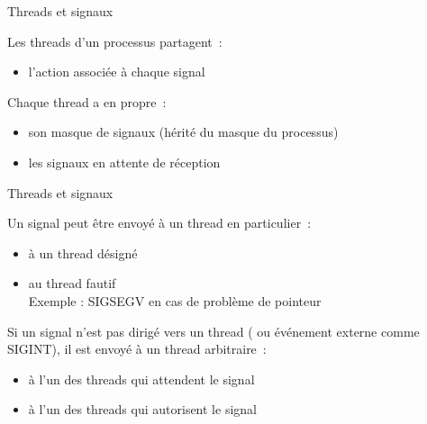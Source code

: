 \begin {frame} {Threads et signaux}

    Les threads d'un processus partagent~:
    \begin {itemize}
	\item l'action associée à chaque signal \\
    \end {itemize}

    Chaque thread a en propre~:
    \begin {itemize}
	\item son masque de signaux (hérité du masque du processus)



	\item les signaux en attente de réception

    \end {itemize}
\end {frame}

\begin {frame} {Threads et signaux}

    Un signal peut être envoyé à un thread en particulier~:

    \begin {itemize}
	\item à un thread désigné \\
	\item au thread fautif \\
	    Exemple : SIGSEGV en cas de problème de pointeur
    \end {itemize}

    \vspace* {3mm}

    Si un signal n'est pas dirigé vers un thread (
    ou événement externe comme SIGINT), il est envoyé à un thread
    arbitraire~:

    \begin {itemize}
	\item à l'un des threads qui attendent le signal \\
	\item à l'un des threads qui autorisent le signal
    \end {itemize}

\end {frame}

